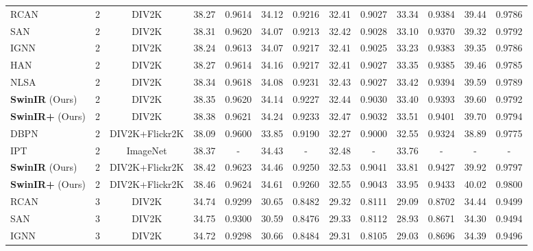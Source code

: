 \documentclass[10pt,twocolumn,letterpaper]{article}
\newcommand{\R}[1]{\textcolor[rgb]{1.00,0.00,0.00}{#1}}
\newcommand{\B}[1]{\textcolor[rgb]{0.00,0.00,1.00}{#1}}
\newcommand{\algname}{SwinIR}
\newlength \g
\begin{document}
\begin{table*}[t]
\begin{center}
\begin{tabular}{|l|c|c|c|c|c|c|c|c|c|c|c|c|}
RCAN~\cite{zhang2018rcan} & 2 & DIV2K & {38.27}
& {0.9614}
& {34.12}
& {0.9216}
& {32.41}
& {0.9027}
& {33.34}
& {0.9384}
& {39.44}
& {0.9786}
\\  
SAN~\cite{dai2019SAN} & 2 & DIV2K & {38.31}
& {0.9620}
& {34.07}
& {0.9213}
& {32.42}
& {0.9028}
& {33.10}
& {0.9370}
& {39.32}
& {0.9792}
\\
IGNN~\cite{zhou2020IGNN} & 2 & DIV2K & {38.24}
& {0.9613}
& {34.07}
& {0.9217}
& {32.41}
& {0.9025}
& {33.23}
& {0.9383}
& {39.35}
& {0.9786}
\\
HAN~\cite{niu2020HAN} & 2 & DIV2K & {38.27}
& {0.9614}
& \B{34.16}
& {0.9217}
& {32.41}
& {0.9027}
& {33.35}
& {0.9385}
& {39.46}
& {0.9785}  
\\ 
NLSA~\cite{mei2021NLSA} & 2 & DIV2K & 38.34 
& 0.9618 
& 34.08 
& \B{0.9231}
& 32.43 
& 0.9027 
& \B{33.42}
& \B{0.9394}
& \B{39.59}
& 0.9789
\\
\textbf{\algname{}} (Ours)  & 2  & DIV2K
& \B{38.35}
& \B{0.9620}
& {34.14}
& {0.9227}
& \B{32.44}
& \B{0.9030}
& {33.40}
& {0.9393}
& {39.60}
& \B{0.9792}
\\
\textbf{\algname{}+} (Ours)  & 2  & DIV2K
& \R{38.38}
& \R{0.9621}
& \R{34.24}
& \R{0.9233}
& \R{32.47}
& \R{0.9032}
& \R{33.51}
& \R{0.9401}
& \R{39.70}
& \R{0.9794}
\\
\hdashline
DBPN~\cite{haris2018DBPN} & 2 & DIV2K+Flickr2K& 38.09
& 0.9600
& 33.85
& 0.9190
& 32.27
& 0.9000
& 32.55
& 0.9324
& 38.89
& 0.9775        
\\
IPT~\cite{chen2021IPT} & 2  & ImageNet& {38.37}
& {-}
& {34.43}
& {-}
& {32.48}
& {-}
& {33.76}
& {-}
& {-}
& {-}
\\
\textbf{\algname{}} (Ours)  & 2  & DIV2K+Flickr2K
& \B{38.42}
& \B{0.9623}
& \B{34.46}
& \B{0.9250}
& \B{32.53}
& \B{0.9041}
& \B{33.81}
& \B{0.9427}
& \B{39.92}
& \B{0.9797}
\\
\textbf{\algname{}+} (Ours)\qquad\qquad\qquad  & 2  & DIV2K+Flickr2K
& \R{38.46}
& \R{0.9624}
& \B{34.61}
& \R{0.9260}
& \R{32.55}
& \R{0.9043}
& \R{33.95}
& \R{0.9433}
& \R{40.02}
& \R{0.9800}
\\

\hline                 
\hline


RCAN~\cite{zhang2018rcan}& 3   & DIV2K
& {34.74}
&{0.9299}
& {30.65}
& {0.8482}
& {29.32}
& {0.8111}
& {29.09}
& {0.8702}
& {34.44}
&{0.9499}
\\
SAN~\cite{dai2019SAN} & 3   & DIV2K
& {34.75}
& {0.9300}
& {30.59}
& {0.8476}
& {29.33}
& {0.8112}
& {28.93}
& {0.8671}
& {34.30}
& {0.9494}
\\
IGNN~\cite{zhou2020IGNN} & 3  & DIV2K
& {34.72}
& {0.9298}
& {30.66}
& {0.8484}
& {29.31}
& {0.8105}
& {29.03}
& {0.8696}
& {34.39}
& {0.9496}
\\


\end{tabular}
\end{center}
\end{table*}
\end{document}

